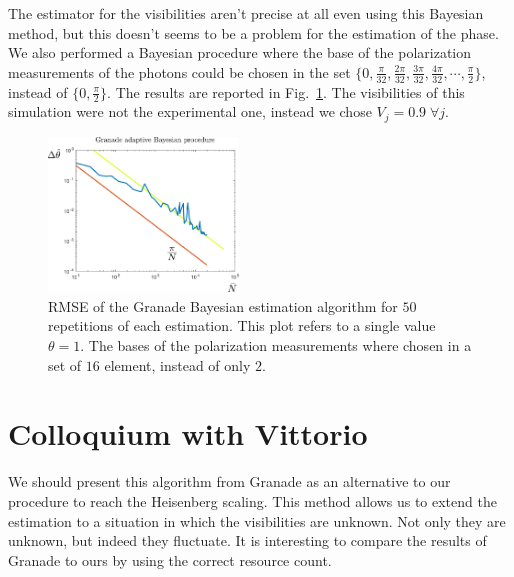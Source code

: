 \documentclass[aps, pra, 10pt, twocolumn, superscriptaddress,floatfix]{revtex4-1}
\begin{document}
%
The estimator for the visibilities aren't precise at all even using this Bayesian method, but this doesn't seems to be a problem for the estimation of the phase. %
We also performed a Bayesian procedure where the base of the polarization measurements of the photons could be chosen in the set $\lbrace 0, \frac{\pi}{32}, \frac{2 \pi}{32}, \frac{3 \pi}{32}, \frac{4 \pi}{32}, \cdots,  \frac{\pi}{2} \rbrace$, instead of $\lbrace 0, \frac{\pi}{2} \rbrace$. The results are reported in Fig.~\ref{fig:overHS09visibility16phases}. The visibilities of this simulation were not the experimental one, instead we chose $V_j = 0.9 \; \forall j$.
%
\begin{figure}[!t]
	\begin{center}
		\includegraphics[width=0.45\textwidth]{overHS09visibility16phases.pdf}
	\end{center}
	\caption{RMSE of the Granade Bayesian estimation algorithm for $50$ repetitions of each estimation. This plot refers to a single value $\theta = 1$. The bases of the polarization measurements where chosen in a set of $16$ element, instead of only $2$.}
	\label{fig:overHS09visibility16phases}
\end{figure}
%

\section{Colloquium with Vittorio}
%
We should present this algorithm from Granade as an alternative to our procedure to reach the Heisenberg scaling. This method allows us to extend the estimation to a situation in which the visibilities are unknown. Not only they are unknown, but indeed they fluctuate. It is interesting to compare the results of Granade to ours by using the correct resource count.
\end{document}
